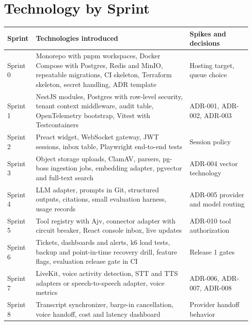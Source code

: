 \section{Technology by Sprint}

{\small
\begin{longtable}{@{}>{\raggedright\arraybackslash}p{}>{\raggedright\arraybackslash}p{}>{\raggedright\arraybackslash}p{}@{}}
\toprule
\textbf{Sprint} & \textbf{Technologies introduced} & \textbf{Spikes and decisions} \\
\midrule
\endhead
\bottomrule
\endfoot
Sprint 0 & Monorepo with pnpm workspaces, Docker Compose with Postgres, Redis and MinIO, repeatable migrations, CI skeleton, Terraform skeleton, secret handling, ADR template & Hosting target, queue choice \\
Sprint 1 & NestJS modules, Postgres with row-level security, tenant context middleware, audit table, OpenTelemetry bootstrap, Vitest with Testcontainers & ADR-001, ADR-002, ADR-003 \\
Sprint 2 & Preact widget, WebSocket gateway, JWT sessions, inbox table, Playwright end-to-end tests & Session policy \\
Sprint 3 & Object storage uploads, ClamAV, parsers, pg-boss ingestion jobs, embedding adapter, pgvector and full-text search & ADR-004 vector technology \\
Sprint 4 & LLM adapter, prompts in Git, structured outputs, citations, small evaluation harness, usage records & ADR-005 provider and model routing \\
Sprint 5 & Tool registry with Ajv, connector adapter with circuit breaker, React console inbox, live updates & ADR-010 tool authorization \\
Sprint 6 & Tickets, dashboards and alerts, k6 load tests, backup and point-in-time recovery drill, feature flags, evaluation release gate in CI & Release 1 gates \\
Sprint 7 & LiveKit, voice activity detection, STT and TTS adapters or speech-to-speech adapter, voice metrics & ADR-006, ADR-007, ADR-008 \\
Sprint 8 & Transcript synchronizer, barge-in cancellation, voice handoff, cost and latency dashboard & Provider handoff behavior \\
\end{longtable}
}



